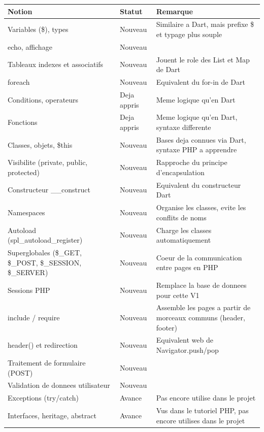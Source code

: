 \documentclass[11pt,a4paper]{article}
\begin{document}
\begin{longtable}{|p{5cm}|p{4cm}|p{5cm}|}
\hline
\textbf{Notion} & \textbf{Statut} & \textbf{Remarque} \\
\hline
Variables (\$), types & Nouveau & Similaire a Dart, mais prefixe \$ et typage plus souple \\
\hline
echo, affichage & Nouveau & \\
\hline
Tableaux indexes et associatifs & Nouveau & Jouent le role des List et Map de Dart \\
\hline
foreach & Nouveau & Equivalent du for-in de Dart \\
\hline
Conditions, operateurs & Deja appris & Meme logique qu'en Dart \\
\hline
Fonctions & Deja appris & Meme logique qu'en Dart, syntaxe differente \\
\hline
Classes, objets, \$this & Nouveau & Bases deja connues via Dart, syntaxe PHP a apprendre \\
\hline
Visibilite (private, public, protected) & Nouveau & Rapproche du principe d'encapsulation \\
\hline
Constructeur \_\_construct & Nouveau & Equivalent du constructeur Dart \\
\hline
Namespaces & Nouveau & Organise les classes, evite les conflits de noms \\
\hline
Autoload (spl\_autoload\_register) & Nouveau & Charge les classes automatiquement \\
\hline
Superglobales (\$\_GET, \$\_POST, \$\_SESSION, \$\_SERVER) & Nouveau & Coeur de la communication entre pages en PHP \\
\hline
Sessions PHP & Nouveau & Remplace la base de donnees pour cette V1 \\
\hline
include / require & Nouveau & Assemble les pages a partir de morceaux communs (header, footer) \\
\hline
header() et redirection & Nouveau & Equivalent web de Navigator.push/pop \\
\hline
Traitement de formulaire (POST) & Nouveau & \\
\hline
Validation de donnees utilisateur & Nouveau & \\
\hline
Exceptions (try/catch) & Avance & Pas encore utilise dans le projet \\
\hline
Interfaces, heritage, abstract & Avance & Vus dans le tutoriel PHP, pas encore utilises dans le projet \\
\hline
\end{longtable}
\end{document}
